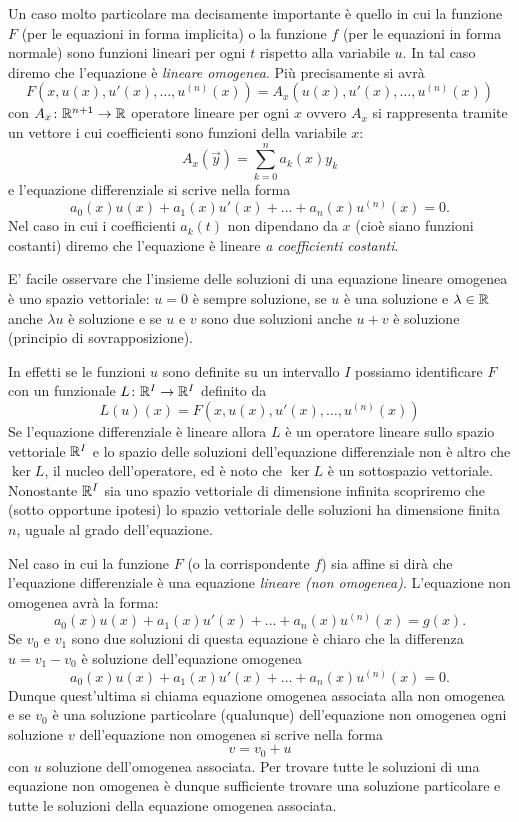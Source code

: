 Un caso molto particolare ma decisamente importante è quello in cui la funzione
$F$ (per le equazioni in forma implicita) o la funzione $f$
(per le equazioni in forma normale) sono funzioni lineari
per ogni $t$
rispetto alla variabile $u$.
In tal caso diremo che l'equazione è
%
%
\emph{lineare omogenea}.
Più precisamente si avrà
\[
F(x,u(x),u'(x), \dots, u^{(n)}(x)) = A_x(u(x), u'(x), \dots, u^{(n)}(x))
\]
con $A_x\colon \mathbb R^{n+1}\to \mathbb R$
operatore lineare per ogni $x$ ovvero $A_x$ si rappresenta tramite un vettore
i cui coefficienti sono funzioni della variabile $x$:
\[
  A_x(\vec y) = \sum_{k=0}^n a_k(x) y_k
\]
e l'equazione differenziale si scrive nella forma
\[
  a_0(x) u(x) + a_1(x) u'(x) + \dots + a_n(x) u^{(n)}(x) = 0.
\]
Nel caso in cui i coefficienti $a_k(t)$ non dipendano da $x$
(cioè siano funzioni costanti) diremo che l'equazione è
lineare
%
%
\emph{a coefficienti costanti}.

E' facile osservare che l'insieme delle soluzioni di una equazione lineare omogenea è uno spazio vettoriale: $u=0$ è sempre soluzione, se $u$ è una soluzione e $\lambda \in \mathbb R$ anche $\lambda u$ è soluzione e se $u$ e $v$ sono due soluzioni anche $u+v$ è soluzione
(principio di sovrapposizione).

In effetti
se le funzioni $u$ sono definite su un intervallo $I$ possiamo
identificare $F$ con un funzionale $L\colon \mathbb R^I \to \mathbb R^I$ definito da
\[
  L(u)(x) = F(x,u(x), u'(x), \dots, u^{(n)}(x))
\]
Se l'equazione differenziale è lineare allora $L$ è un operatore lineare
sullo spazio vettoriale $\mathbb R^I$ e lo spazio delle soluzioni dell'equazione
differenziale non è altro che $\ker L$, il nucleo dell'operatore,
ed è noto che $\ker L$ è un sottospazio vettoriale.
Nonostante $\mathbb R^I$ sia uno spazio vettoriale di dimensione infinita scopriremo
che (sotto opportune ipotesi) lo spazio vettoriale delle soluzioni
ha dimensione finita $n$, uguale al grado dell'equazione.

Nel caso in cui la funzione $F$ (o la corrispondente $f$)
sia affine si dirà che l'equazione differenziale
è una equazione
%
%
\emph{lineare (non omogenea)}.
L'equazione non omogenea avrà la forma:
\[
  a_0(x) u(x) + a_1(x) u'(x) + \dots + a_n(x) u^{(n)}(x) = g(x).
\]
Se $v_0$ e $v_1$ sono due soluzioni di questa equazione è chiaro che la
differenza $u=v_1 - v_0$ è soluzione dell'equazione omogenea
\[
  a_0(x) u(x) + a_1(x) u'(x) + \dots + a_n(x) u^{(n)}(x) = 0.
\]
Dunque quest'ultima si chiama equazione omogenea associata alla non omogenea
e se $v_0$ è una soluzione particolare (qualunque) dell'equazione non omogenea
ogni soluzione $v$ dell'equazione non omogenea si scrive nella forma
\[
  v = v_0 + u
\]
con $u$ soluzione dell'omogenea associata.
Per trovare tutte le soluzioni di una equazione non omogenea è dunque
sufficiente trovare una soluzione particolare e tutte le soluzioni della
equazione omogenea associata.

